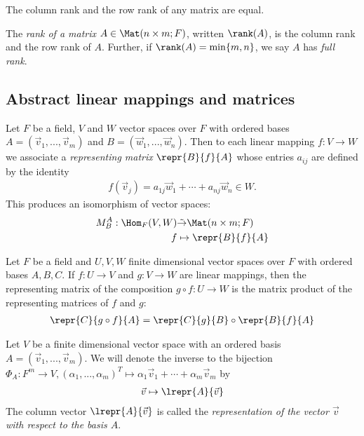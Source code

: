 \documentclass{article}
\begin{document}
\begin{theorem}[Notes 2.2.8]
    The column rank and the row rank of any matrix are equal.
\end{theorem}

\begin{definition}
    The \emph{rank of a matrix} $A\in\Mat(n\times m;F)$, written $\rank(A)$, is the column rank and the
    row rank of $A$. Further, if $\rank(A) = \min\{m,n\}$, we say $A$ has
    \emph{full rank}.
\end{definition}

\subsection{Abstract linear mappings and matrices}

\begin{theorem}[Notes 2.3.1]
    Let $F$ be a field, $V$ and $W$ vector spaces over $F$ with ordered bases $A=(\vec v_1,...,\vec v_m)$
    and $B=(\vec w_1,...,\vec w_n)$. Then to each linear mapping $f:V\to W$ we associate a 
    \emph{representing matrix} $\repr{B}{f}{A}$ whose entries $a_{ij}$ are defined by the 
    identity
    \begin{align*}
        f(\vec v_j) = a_{1j}\vec w_1 + \cdots + a_{nj}\vec w_n \in W.
    \end{align*}
    This produces an isomorphism of vector spaces:
    \begin{align*}
        M^A_B:\Hom_F(V,W)           & \tilde\to \Mat(n\times m; F)\\
        f                           &   \mapsto \repr{B}{f}{A}
    \end{align*}
\end{theorem}

\begin{theorem}[Notes 2.3.2]
    Let $F$ be a field and $U,V,W$ finite dimensional vector spaces over $F$ with ordered bases 
    $A,B,C$. If $f:U\to V$ and $g:V\to W$ are linear mappings, then the representing matrix of 
    the composition $g\circ f:U\to W$ is the matrix product of the representing matrices of 
    $f$ and $g$:
    \begin{align*}
        \repr{C}{g\circ f}{A}=\repr{C}{g}{B}\circ\repr{B}{f}{A}
    \end{align*} 
\end{theorem}

\begin{definition}
    Let $V$ be a finite dimensional vector space with an ordered basis $A=(\vec v_1,...,\vec v_m)$.
    We will denote the inverse to the bijection $\Phi_A:F^m\to V,(\alpha_1,...,\alpha_m)^T\mapsto \alpha_1\vec v_1+\cdots+\alpha_m\vec v_m$
    by
    \begin{align*}
        \vec v \mapsto \lrepr{A}{\vec v}
    \end{align*}
    The column vector $\lrepr{A}{\vec v}$ is called the \emph{representation of the vector $\vec v$
    with respect to the basis $A$}.
\end{definition}
\end{document}
